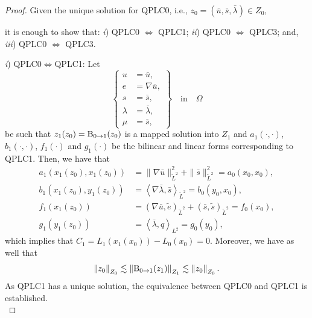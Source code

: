 \begin{proof}
Given the unique solution for QPLC0, i.e., $z_0 = (\bar{u},\bar{s},\bar{\lambda}) \in Z_0$,

it is enough to show that: \textit{i}) QPLC0 $\iff$ QPLC1; \textit{ii}) QPLC0 $\iff$ QPLC3; and, \textit{iii}) QPLC0 $\iff$ QPLC3.

\noindent \textit{i}) QPLC0$\iff$QPLC1: Let
\begin{equation}
\left\lbrace
\begin{array}{rll}
    u       &= \bar{u},\\
    e       &= \nabla \bar{u},\\
    s       &= \bar{s},\\
    \lambda &= \bar{\lambda},\\
    \mu     &= \bar{s},
    \end{array}
\right\rbrace \quad \textrm{in} \quad \Omega
\end{equation}
be such that $z_1(z_0) = \operatorname{B}_{0 \to 1} (z_0)$ is a mapped solution into $Z_1$
and $a_1(\cdot,\cdot)$, $b_1(\cdot, \cdot)$, $f_1(\cdot)$ and $g_1(\cdot)$ be the bilinear and linear forms corresponding to QPLC1.
Then, we have that
\begin{align}
a_1(x_1(z_0), x_1(z_0)) &= \|\nabla \bar{u}\|^2_{\tilde{L}^2}+\|\bar{s}\|^2_{\tilde{L}^2} = a_0(x_0, x_0),\\
b_1(x_1(z_0), y_1(z_0)) &= \left\langle \nabla \bar{\lambda}, \bar{s} \right\rangle_{\tilde{L}^2} = b_0(y_0, x_0),\\
f_1(x_1(z_0))   &= \left( \nabla \bar{u}, \tilde{e}\right)_{\tilde{L}^2} + \left( \bar{s}, \tilde{s}\right)_{\tilde{L}^2} = f_0(x_0), \\
g_1(y_1(z_0))   &= \left\langle \bar{\lambda} , q \right\rangle_{L^2}  = g_0(y_0),
\end{align}
which implies that $C_1 = L_1(x_1(x_0))-L_0(x_0) = 0$.
Moreover, we have as well that
\begin{equation}
\left\|z_0\right\|_{Z_0}
\lesssim
\left\|\operatorname{B}_{0 \to 1}(z_1)\right\|_{Z_1}
\lesssim
\left\|z_0\right\|_{Z_0}.
\end{equation}
As QPLC1 has a unique solution, the equivalence between QPLC0 and QPLC1 is established.\\ 


\end{proof}
